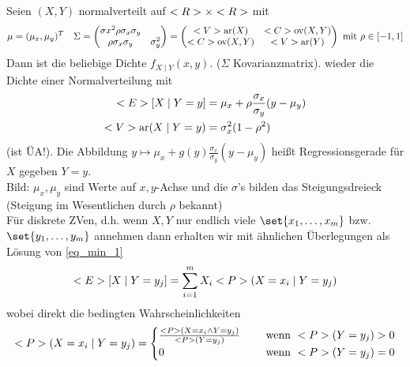 \begin{*example}
	Seien $(X,Y)$ normalverteilt auf $\R\times \R$ mit 
		\begin{align*}
			\mu = (\mu_x, \mu_y)^T \quad \Sigma = \begin{pmatrix}
			\sigma x^2 \rho\sigma_x \sigma_y\\
			\rho \sigma_x \sigma_y & \sigma_y^2
			\end{pmatrix} = \begin{pmatrix}
				\Var(X) & \Cov(X,Y)\\
				\Cov(X,Y) & \Var(Y)
			\end{pmatrix} \mit \rho \in [-1,1]
		\end{align*}
		Dann ist die beliebige Dichte $f_{X\mid Y}(x,y)$. ($\Sigma$ Kovarianzmatrix). wieder die Dichte einer Normalverteilung mit
		\begin{align*}
			\E[X \mid Y=y] &= \mu_x + \rho \frac{\sigma_x}{\sigma_y}(y-\mu_y)\\
			\Var(X\mid Y=y) &= \sigma_x^2(1-\rho^2)
		\end{align*}
		(ist ÜA!). Die Abbildung $y \mapsto \mu_x + g(y)\frac{\sigma_x}{\sigma_y}(y-\mu_y)$ heißt Regressionsgerade für $X$ gegeben $Y=y$.\\
		Bild: $\mu_x,\mu_y$ sind Werte auf $x,y$-Achse und die $\sigma$'s bilden das Steigungsdreieck (Steigung im Wesentlichen durch $\rho$ bekannt)\\
		Für diskrete ZVen, d.h. wenn $X,Y$ nur endlich viele $\set{x_1,\dots,x_m}$ bzw. $\set{y_1,\dots,y_m}$ annehmen dann erhalten wir mit ähnlichen Überlegungen als Lösung von \eqref{eq_min_1}
		\begin{align*}
			\E[X\mid Y=y_j] = \sum_{i=1}^m X_i \P(X=x_i \mid Y=y_j)
		\end{align*}
		wobei direkt die bedingten Wahrscheinlichkeiten
		\begin{align*}
			\P(X=x_i \mid Y=y_j) = \begin{cases}
			\frac{\P(X=x_i \wedge Y=y_j)}{\P(Y=y_j)} &\quad \text{ wenn } \P(Y=y_j) > 0\\
			0 &\quad \text{ wenn } \P(Y=y_j) = 0 
			\end{cases}
		\end{align*}
\end{*example}
